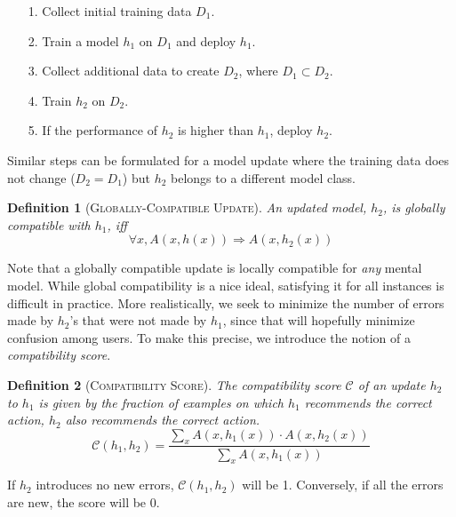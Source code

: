 \documentclass[letterpaper]{article} %
\newcommand{\?}{\mbox{?}}
\newcommand{\hone}{\mbox{$h_1$}}
\newcommand{\htwo}{\mbox{$h_2$}}
\newcommand{\dtrainone}{\mbox{$D_1$}}
\newcommand{\dtraintwo}{\mbox{$D_2$}}
\newcommand{\compatscore}{\mathcal{C}}
\newtheorem*{definition}{Definition}
\begin{document}
\begin{itemize}
\setlength\itemsep{.1em}
    \item[1.] Collect initial training data $\dtrainone$.
    \item[2.] Train a model $\hone$ on $\dtrainone$ and deploy $\hone$.
    \item[3.] Collect additional data to create $\dtraintwo$, where $\dtrainone \subset \dtraintwo$.
    \item[4.] Train $\htwo$ on $\dtraintwo$.
    \item[5.] If the performance of $\htwo$ is higher than $\hone$, deploy $\htwo$.
\end{itemize}
Similar steps can be formulated for a model update where the training data does not change ($\dtraintwo=\dtrainone$) but $\htwo$ belongs to a different model class. 
\begin{definition}[\textsc{Globally-Compatible Update}]
An updated model, \htwo,  is globally compatible with \hone, iff
\[\forall x, A(x, h(x))\Rightarrow A(x, \htwo(x)) \]
\end{definition}

Note that a globally compatible update is locally compatible for {\em any} mental model.  While global compatibility is a nice ideal, satisfying it for all instances is difficult in practice. More realistically, we seek to minimize the number of errors made by \htwo's that were not made by $\hone$, since that will hopefully minimize confusion among users. 
To make this precise, we introduce the notion of a {\em compatibility score}. 

\begin{definition} [\textsc{Compatibility Score}]   
The compatibility score $\compatscore$ of an update $\htwo$ to $\hone$ is given by the fraction of examples on which $\hone$ recommends the correct action, $\htwo$ also recommends the correct action.
\begin{equation}
\label{eq:score}
    \compatscore(\hone, \htwo) =  \frac{\sum_{x}A(x, \hone(x)) \cdot A(x, \htwo(x))}{\sum_{x }A(x, \hone(x))}
\end{equation}
\end{definition}
If $\htwo$ introduces no new errors, $\compatscore(\hone, \htwo)$ will be 1. Conversely, if all the errors are new, the score will be 0. 
\end{document}
